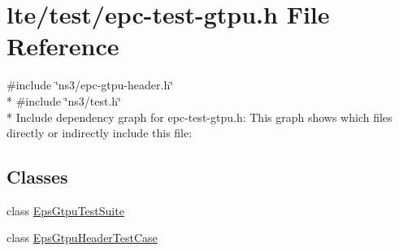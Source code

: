 \hypertarget{epc-test-gtpu_8h}{}\section{lte/test/epc-\/test-\/gtpu.h File Reference}
\label{epc-test-gtpu_8h}
{\ttfamily \#include \char`\"{}ns3/epc-\/gtpu-\/header.\+h\char`\"{}}\\*
{\ttfamily \#include \char`\"{}ns3/test.\+h\char`\"{}}\\*
Include dependency graph for epc-\/test-\/gtpu.h\+:
This graph shows which files directly or indirectly include this file\+:
\subsection*{Classes}
\begin{DoxyCompactItemize}
\item 
class \hyperlink{classEpsGtpuTestSuite}{Eps\+Gtpu\+Test\+Suite}
\item 
class \hyperlink{classEpsGtpuHeaderTestCase}{Eps\+Gtpu\+Header\+Test\+Case}
\end{DoxyCompactItemize}
